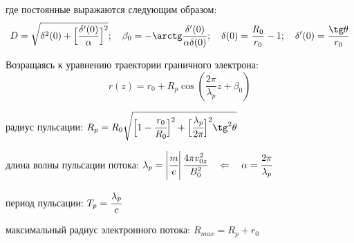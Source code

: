 где постоянные выражаются следующим образом:
\[
	D = \sqrt{ \delta^2(0) + \Big[ \frac{\delta'(0)}{\alpha} \Big]^2 };
	\quad
	\beta_0 = -\arctg\frac{\delta'(0)}{\alpha\delta(0)};\quad
	\delta(0) = \frac{R_0}{r_0} - 1;\quad
	\delta'(0) = \frac{\tg\theta}{r_0}
\]

Возращаясь к уравнению траектории граничного электрона:
\[
	r(z) = r_0 + R_p \cos\left( \frac{2\pi}{\lambda_p}z + \beta_0 \right)
\]

радиус пульсации: 
\( 
	R_p = R_0 \sqrt{ \Big[ 1 - \cfrac{r_0}{R_0} \Big] ^2 + 
		\Big[ \cfrac{\lambda_p}{2\pi} \Big]^2 \tg^2\theta }
\)

длина волны пульсации потока:
\(
	\lambda_p = \left|\cfrac{m}{e}\right|\cfrac{4\pi v^2_{0z}}{B^2_0} 
		\quad\Leftarrow\quad \alpha = \cfrac{2\pi}{\lambda_p}
\) 

период пульсации:
\( T_p = \cfrac{\lambda_p}{c} \)

максимальный радиус электронного потока:
\( R_{max} = R_p + r_0\)

\begin{figure}[h]
	\vspace{-4ex}
	\begin{minipage}[h]{0.5\linewidth}
	\end{minipage}
	\begin{minipage}[h]{0.5\linewidth}
	\end{minipage}
\end{figure}


